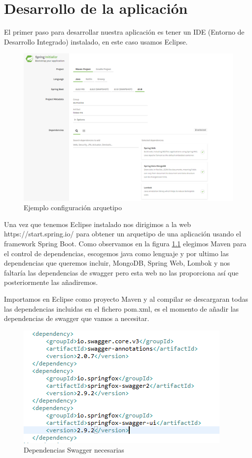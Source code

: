 \documentclass[12pt]{report} %
\begin{document}
\chapter{Desarrollo de la aplicación}

El primer paso para desarrollar nuestra aplicación es tener un IDE (Entorno de Desarrollo Integrado) instalado, en este caso usamos Eclipse.

\begin{figure}
	\centering
	\includegraphics[width=0.7\linewidth]{imagenes/arquetipo}
	\caption{Ejemplo configuración arquetipo}
	\label{fig:arquetipo}
\end{figure}

Una vez que tenemos Eclipse instalado nos dirigimos a la web https://start.spring.io/ para obtener un arquetipo de una aplicación usando el framework Spring Boot. Como observamos en la figura \ref{fig:arquetipo} elegimos Maven para el control de dependencias, escogemos java como lenguaje y por ultimo las dependencias que queremos incluir, MongoDB, Spring Web, Lombok y nos faltaría las dependencias de swagger pero esta web no las proporciona así que posteriormente las añadiremos.

Importamos en Eclipse como proyecto Maven y al compilar se descargaran todas las dependencias incluidas en el fichero pom.xml, es el momento de añadir las dependencias de swagger que vamos a necesitar.

\begin{figure}
	\centering
	\includegraphics[width=0.7\linewidth]{imagenes/dependenciasSwagger}
	\caption{Dependencias Swagger necesarias}
	\label{fig:dependenciasswagger}
\end{figure}
\end{document}
